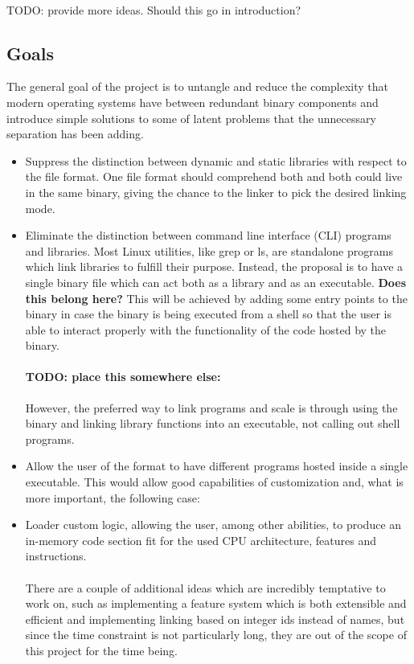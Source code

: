 \documentclass[12pt]{article}
\begin{document}
	\paragraph{}TODO: provide more ideas. Should this go in introduction?
	\subsection{Goals}
	The general goal of the project is to untangle and reduce the complexity that modern operating systems have between redundant binary components and introduce simple solutions to some of latent problems that the unnecessary separation has been adding.
	\begin{itemize}
		\item Suppress the distinction between dynamic and static libraries with respect to the file format. One file format should comprehend both and both could live in the same binary, giving the chance to the linker to pick the desired linking mode.
		\item Eliminate the distinction between command line interface (CLI) programs and libraries. Most Linux utilities, like grep or ls, are standalone programs which link libraries to fulfill their purpose. Instead, the proposal is to have a single binary file which can act both as a library and as an executable. \textbf{Does this belong here?} This will be achieved by adding some entry points to the binary in case the binary is being executed from a shell so that the user is able to interact properly with the functionality of the code hosted by the binary.
		\paragraph{TODO: place this somewhere else:}However, the preferred way to link programs and scale is through using the binary and linking library functions into an executable, not calling out shell programs.
		\item Allow the user of the format to have different programs hosted inside a single executable. This would allow good capabilities of customization and, what is more important, the following case:
		\item Loader custom logic, allowing the user, among other abilities, to produce an in-memory code section fit for the used CPU architecture, features and instructions.
		\paragraph{} There are a couple of additional ideas which are incredibly temptative to work on, such as implementing a feature system which is both extensible and efficient and implementing linking based on integer ids instead of names, but since the time constraint is not particularly long, they are out of the scope of this project for the time being.
	\end{itemize}
\end{document}
